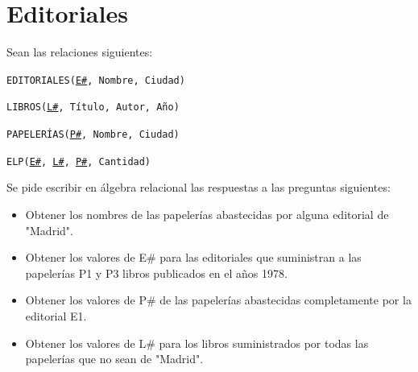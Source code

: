 \documentclass[a4paper]{article}
\begin{document}
\section{Editoriales}

Sean las relaciones siguientes:

\texttt{EDITORIALES(\underline{E\#}, Nombre, Ciudad)}

\texttt{LIBROS(\underline{L\#}, Título, Autor, Año)}

\texttt{PAPELERÍAS(\underline{P\#}, Nombre, Ciudad)}

\texttt{ELP(\underline{E\#}, \underline{L\#}, \underline{P\#}, Cantidad)}

Se pide escribir en álgebra relacional las respuestas a las preguntas siguientes:

\begin{itemize}
    \item Obtener los nombres de las papelerías abastecidas por alguna editorial de "Madrid".
    \item Obtener los valores de E\# para las editoriales que suministran a las papelerías P1 y P3 libros publicados en el años 1978.
    \item Obtener los valores de P\# de las papelerías abastecidas completamente por la editorial E1.
    \item Obtener los valores de L\# para los libros suministrados por todas las papelerías que no sean de "Madrid".

\end{itemize}
\end{document}
